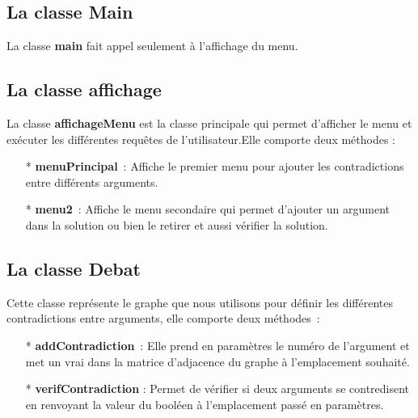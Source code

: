 \documentclass[12pt]{article}
\begin{document}
	\subsection{La classe Main}
	La classe \textbf{main} fait appel seulement à l’affichage du menu.
	\subsection{La classe affichage}
	La classe \textbf{affichageMenu} est la classe principale qui permet d’afficher le menu et exécuter les
	différentes requêtes de l’utilisateur.Elle comporte deux méthodes :
	\begin{itemize}
		\item [*] \textbf{menuPrincipal} : Affiche le premier menu pour ajouter les contradictions entre différents arguments.
		\item [*] \textbf{menu2} : Affiche le menu secondaire qui permet d’ajouter un argument dans la solution ou
		bien le retirer et aussi vérifier la solution.
	\end{itemize}
	\subsection{La classe Debat}
	Cette classe représente le graphe que nous utilisons pour définir les différentes contradictions entre arguments, elle comporte deux méthodes :
	\begin{itemize}
		\item [*] \textbf{addContradiction} : Elle prend en paramètres le numéro de l’argument et met un vrai
		dans la matrice d’adjacence du graphe à l’emplacement souhaité.
		\item [*] \textbf{verifContradiction} : Permet de vérifier si deux arguments se contredisent en renvoyant la valeur du booléen à l’emplacement passé en paramètres.
	\end{itemize}
\end{document}
